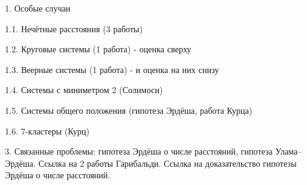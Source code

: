 1. Особые случаи

1.1. Нечётные расстояния (3 работы)

1.2. Круговые системы (1 работа) - оценка сверху

1.3. Веерные системы (1 работа) - и оценка на них снизу

1.4. Системы с миниметром 2 (Солимоси)

1.5. Системы общего положения (гипотеза Эрдёша, работа Курца)

1.6. 7-кластеры (Курц)



3. Связанные проблемы: гипотеза Эрдёша о числе расстояний, гипотеза Улама--Эрдёша.
Ссылка на 2 работы Гарибальди. Ссылка на доказательство гипотезы Эрдёша о числе расстояний.


